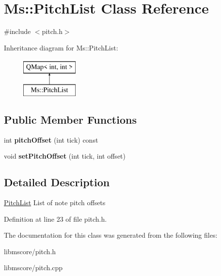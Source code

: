 \hypertarget{class_ms_1_1_pitch_list}{}\section{Ms\+:\+:Pitch\+List Class Reference}
\label{class_ms_1_1_pitch_list}


{\ttfamily \#include $<$pitch.\+h$>$}

Inheritance diagram for Ms\+:\+:Pitch\+List\+:\begin{figure}[H]
\begin{center}
\leavevmode
\includegraphics[height=2.000000cm]{class_ms_1_1_pitch_list}
\end{center}
\end{figure}
\subsection*{Public Member Functions}
\begin{DoxyCompactItemize}
\item 
\mbox{\label{class_ms_1_1_pitch_list_a15889a11f2a83d5f2f87446a1fafcdb6}} 
int {\bfseries pitch\+Offset} (int tick) const
\item 
\mbox{\label{class_ms_1_1_pitch_list_a7dc1aa22d94ac3161754c5e804b3b71f}} 
void {\bfseries set\+Pitch\+Offset} (int tick, int offset)
\end{DoxyCompactItemize}


\subsection{Detailed Description}
\hyperlink{class_ms_1_1_pitch_list}{Pitch\+List} List of note pitch offsets 

Definition at line 23 of file pitch.\+h.



The documentation for this class was generated from the following files\+:\begin{DoxyCompactItemize}
\item 
libmscore/pitch.\+h\item 
libmscore/pitch.\+cpp\end{DoxyCompactItemize}
